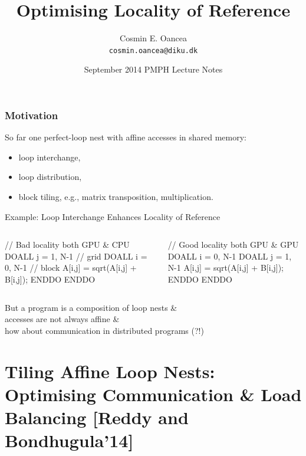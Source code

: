 \documentclass{beamer}
\title[Locality]{Optimising Locality of Reference}
\author[C.~Oancea]{Cosmin E. Oancea\\{\tt cosmin.oancea@diku.dk}}
\institute{Department of Computer Science (DIKU)\\University of Copenhagen}
\date[Sept 2014]{September 2014 PMPH Lecture Notes}
\newcommand{\emphh}[1]{\textcolor{CosGreen}{ #1}}
\begin{document}
\titleslide




\begin{frame}[fragile,t]
  \frametitle{Motivation}

\emphh{So far one perfect-loop nest with affine accesses in shared memory}:
\begin{itemize}
    \item loop interchange,
    \item loop distribution,
    \item block tiling, e.g., matrix transposition, multiplication.
\end  {itemize}\bigskip

\begin{block}{Example: Loop Interchange Enhances Locality of Reference}
\begin{columns}
\begin{colorcode}
// Bad locality both GPU \& CPU
\emphh{DOALL j = 1, N-1} // grid
  \emphh{DOALL i = 0, N-1} // block
    A[i,j] = sqrt(A[i,j] + B[i,j]);
  ENDDO
ENDDO
\end{colorcode}
\begin{colorcode}
// Good locality both GPU \& GPU
\emphh{DOALL i = 0, N-1}
  \emphh{DOALL j = 1, N-1}    
    A[i,j] = sqrt(A[i,j] + B[i,j]);
  ENDDO
ENDDO
\end{colorcode}
\end{columns}
\end{block} 
 
\alert{But a program is a composition of loop nests \&\\ 
accesses are not always affine \&\\
how about communication in distributed programs (?!)}

\end{frame}


\begin{frame}[fragile]
	\tableofcontents
\end{frame}

\section{Tiling Affine Loop Nests: Optimising Communication \& Load Balancing [Reddy and Bondhugula'14]}
\end{document}
